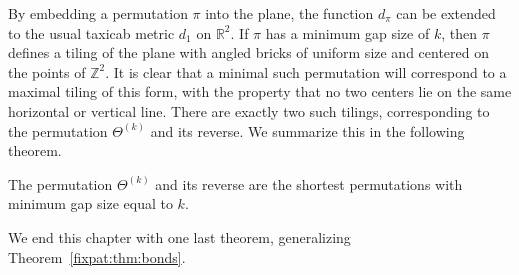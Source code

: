 

  By embedding a permutation $\pi$ into the plane, the function $d_\pi$ can be
  extended to the usual taxicab metric $d_1$ on $\mathbb{R}^2$. If $\pi$ has a
  minimum gap size of $k$, then $\pi$ defines a tiling of the plane with angled
  bricks of uniform size and centered on the points of $\mathbb{Z}^2$. It
  is clear that a minimal such permutation will correspond to a maximal tiling
  of this form, with the property that no two centers lie on the same
  horizontal or vertical line. There are exactly two such tilings, corresponding to
  the permutation $\Theta^{(k)}$ and its reverse.
  We summarize this in the following theorem. 

  \begin{theorem} \label{fixpat:thm:tiling}
    The permutation $\Theta^{(k)}$ and its reverse are the shortest
    permutations with minimum gap size equal to $k$. 
  \end{theorem}

  We end this chapter with one last theorem, generalizing
  Theorem~\ref{fixpat:thm:bonds}.

